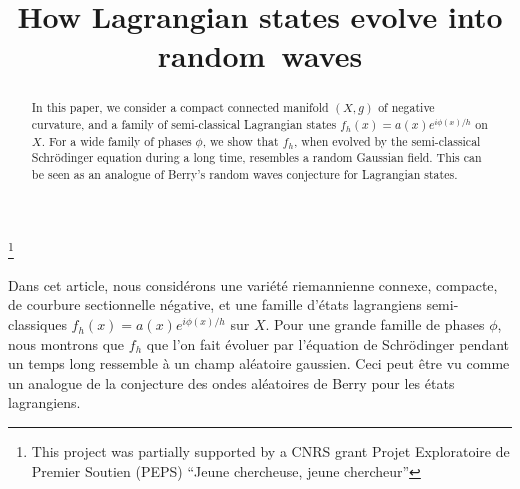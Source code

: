 \documentclass[JEP,XML,SOM,Unicode,published]{cedram}
\theoremstyle{plain}
\theoremstyle{definition}
\begin{document}
\title{How Lagrangian states evolve into random~waves}

\author[\initial{M.} \lastname{Ingremeau}]{ }
\address{Laboratoire J.A. Dieudonné, Université Côte d'Azur\\
Parc Valrose, 06108 Nice Cedex 2, France}

\author[\initial{A.} \lastname{Rivera}]{ }
\address{École Polytechnique Fédérale de Lausanne, Chair of Random Geometry\\
CH-1015 Lausanne, Suisse}
\email{}
\urladdr{}

\thanks{This project was partially supported by a CNRS grant Projet Exploratoire de Premier Soutien (PEPS) ``Jeune chercheuse, jeune chercheur''}

\begin{abstract}
In this paper, we consider a compact connected manifold $(X,g)$ of negative curvature, and a family of semi-classical Lagrangian states $f_h(x) = a(x) e^{i\phi(x)/h}$ on $X$. For a wide family of phases $\phi$, we show that $f_h$, when evolved by the semi-classical Schrödinger equation during a long time, resembles a random Gaussian field. This can be seen as an analogue of Berry's random waves conjecture for Lagrangian states.
\end{abstract}





\begin{altabstract}
Dans cet article, nous considérons une variété riemannienne connexe, compacte, de courbure sectionnelle négative, et une famille d’états lagrangiens semi-classiques $f_h(x) = a(x) e^{i\phi(x)/h}$ sur $X$. Pour une grande famille de phases $\phi$, nous montrons que $f_h$ que l’on fait évoluer par l’équation de Schrödinger pendant un temps long ressemble à un champ aléatoire gaussien. Ceci peut être vu comme un analogue de la conjecture des ondes aléatoires de Berry pour les états lagrangiens.
\end{altabstract}
\end{document}
